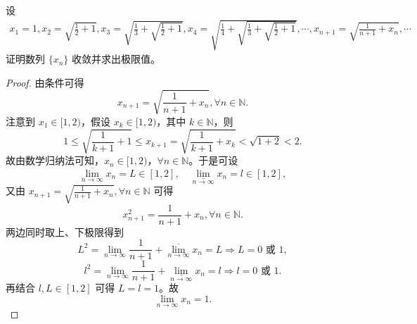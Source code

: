 \documentclass[lang=cn,newtx,10pt,scheme=chinese]{../Template/elegantbook}
\begin{document}
\begin{example}
设
\begin{align*}
x_1 = 1, 
x_2 = \sqrt{\frac{1}{2} + 1}, 
x_3 = \sqrt{\frac{1}{3} + \sqrt{\frac{1}{2} + 1}}, 
x_4 = \sqrt{\frac{1}{4} + \sqrt{\frac{1}{3} + \sqrt{\frac{1}{2} + 1}}}, 
\cdots ,
x_{n+1} = \sqrt{\frac{1}{n+ 1}  + x_n}, \cdots
\end{align*}
证明数列 $\{x_n\}$ 收敛并求出极限值。
\end{example}
\begin{proof}
由条件可得  
\[
x_{n+1}=\sqrt{\frac{1}{n+1}+x_n},\forall n\in \mathbb{N}.
\]
注意到 $x_1\in [1,2)$，假设 $x_k\in [1,2)$，其中 $k\in \mathbb{N}$，则  
\[
1\leqslant \sqrt{\frac{1}{k+1}+1}\leqslant x_{k+1}=\sqrt{\frac{1}{k+1}+x_k}<\sqrt{1+2}<2.
\]
故由数学归纳法可知，$x_n\in [1,2)$，$\forall n\in \mathbb{N}$。于是可设  
\[
\underset{n\rightarrow \infty}{\overline{\lim }}x_n=L\in [1,2],\quad \underset{n\rightarrow \infty}{\underline{\lim }}x_n=l\in [1,2],
\]
又由 $x_{n+1}=\sqrt{\frac{1}{n+1}+x_n},\forall n\in \mathbb{N}$ 可得  
\[
x_{n+1}^{2}=\frac{1}{n+1}+x_n,\forall n\in \mathbb{N}.
\]
两边同时取上、下极限得到  
\[
L^2=\underset{n\rightarrow \infty}{\lim}\frac{1}{n+1}+\underset{n\rightarrow \infty}{\overline{\lim }}x_n=L\Rightarrow L=0\text{ 或 }1,
\]
\[
l^2=\underset{n\rightarrow \infty}{\lim}\frac{1}{n+1}+\underset{n\rightarrow \infty}{\underline{\lim }}x_n=l\Rightarrow l=0\text{ 或 }1.
\]
再结合 $l,L\in [1,2]$ 可得 $L=l=1$。故  
\[
\underset{n\rightarrow \infty}{\lim}x_n=1.
\]
\end{proof}
\end{document}
